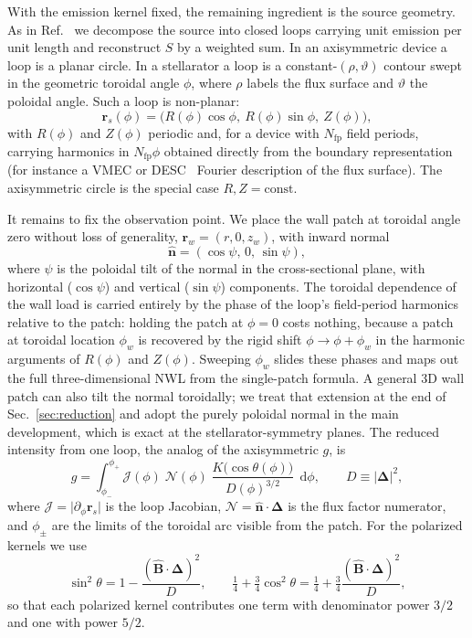 \documentclass[11pt]{article}
\newcommand{\rs}{\bm{r}_s}
\newcommand{\rw}{\bm{r}_w}
\newcommand{\Del}{\bm{\Delta}}
\newcommand{\nhat}{\hat{\bm{n}}}
\newcommand{\Bhat}{\hat{\bm{B}}}
\newcommand{\Nfp}{N_{\mathrm{fp}}}
\newcommand{\dd}{\,\mathrm{d}}
\begin{document}
With the emission kernel fixed, the remaining ingredient is the source geometry. As in Ref.~\cite{schwartz2025} we decompose the source into closed loops carrying unit emission per unit length and reconstruct $S$ by a weighted sum. In an axisymmetric device a loop is a planar circle. In a stellarator a loop is a constant-$(\rho,\vartheta)$ contour swept in the geometric toroidal angle $\phi$, where $\rho$ labels the flux surface and $\vartheta$ the poloidal angle. Such a loop is non-planar:
\begin{equation}
\rs(\phi)=\big(R(\phi)\cos\phi,\ R(\phi)\sin\phi,\ Z(\phi)\big),
\label{eq:loop}
\end{equation}
with $R(\phi)$ and $Z(\phi)$ periodic and, for a device with $\Nfp$ field periods, carrying harmonics in $\Nfp\phi$ obtained directly from the boundary representation (for instance a VMEC or DESC~\cite{desc2023} Fourier description of the flux surface). The axisymmetric circle is the special case $R,Z=\text{const}$.

It remains to fix the observation point. We place the wall patch at toroidal angle zero without loss of generality, $\rw=(r,0,z_w)$, with inward normal
\begin{equation}
\nhat=(\cos\psi,\,0,\,\sin\psi),
\label{eq:normal}
\end{equation}
where $\psi$ is the poloidal tilt of the normal in the cross-sectional plane, with horizontal ($\cos\psi$) and vertical ($\sin\psi$) components. The toroidal dependence of the wall load is carried entirely by the phase of the loop's field-period harmonics relative to the patch: holding the patch at $\phi=0$ costs nothing, because a patch at toroidal location $\phi_w$ is recovered by the rigid shift $\phi\to\phi+\phi_w$ in the harmonic arguments of $R(\phi)$ and $Z(\phi)$. Sweeping $\phi_w$ slides these phases and maps out the full three-dimensional NWL from the single-patch formula. A general 3D wall patch can also tilt the normal toroidally; we treat that extension at the end of Sec.~\ref{sec:reduction} and adopt the purely poloidal normal in the main development, which is exact at the stellarator-symmetry planes. The reduced intensity from one loop, the analog of the axisymmetric $g$, is
\begin{equation}
g=\int_{\phi_-}^{\phi_+}\!\mathcal{J}(\phi)\;\mathcal{N}(\phi)\;
\frac{K\!\big(\cos\theta(\phi)\big)}{D(\phi)^{3/2}}\;\dd\phi,
\qquad D\equiv\lvert\Del\rvert^{2},
\label{eq:g}
\end{equation}
where $\mathcal{J}=\lvert\partial_\phi\rs\rvert$ is the loop Jacobian, $\mathcal{N}=\nhat\cdot\Del$ is the flux factor numerator, and $\phi_\pm$ are the limits of the toroidal arc visible from the patch. For the polarized kernels we use
\begin{equation}
\sin^2\theta=1-\frac{(\Bhat\cdot\Del)^2}{D},\qquad
\tfrac14+\tfrac34\cos^2\theta=\tfrac14+\tfrac34\frac{(\Bhat\cdot\Del)^2}{D},
\label{eq:kernelsplit}
\end{equation}
so that each polarized kernel contributes one term with denominator power $3/2$ and one with power $5/2$.
\end{document}
